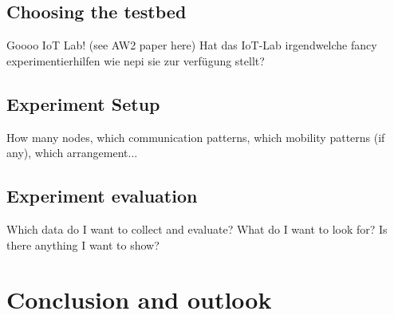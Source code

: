 \documentclass{acm_proc_article-sp}
\begin{document}
\subsection{Choosing the testbed}
\label{subsec:testbed_choice}
Goooo IoT Lab! (see AW2 paper here)
Hat das IoT-Lab irgendwelche fancy experimentierhilfen wie nepi sie zur verfügung stellt?

\subsection{Experiment Setup}
\label{subsec:setup}
How many nodes, which communication patterns, which mobility patterns (if any), which arrangement...

\subsection{Experiment evaluation}
\label{subsec:evaluation}
Which data do I want to collect and evaluate? What do I want to look for? Is there anything I want to show?


\section{Conclusion and outlook}
\label{sec:Conclusion}

\end{document}
